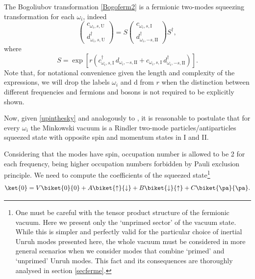 The Bogoliubov transformation \eqref{Bogoferm2} is a fermionic two-modes squeezing transformation for each $\omega_i$, indeed
\begin{equation}\label{upinthesky}\left(\!\begin{array}{c}
c_{\omega_i,s,\text{U}}\\
d^\dagger_{\omega_i,s,\text{U}}
\end{array}\!\right)=S\left(\!\begin{array}{c}
c_{\omega_i,s,\text{I}}\\
d^\dagger_{\omega_i,-s,\text{II}}
\end{array}\!\right)S^\dagger,\end{equation}
where
\begin{equation}\label{squeez}
S=\exp\left[r\left(c_{\omega_i,s,\text{I}}^\dagger\, d_{\omega_i,-s,\text{II}}+c_{\omega_i,s,\text{I}}\, d_{\omega_i,-s,\text{II}}^\dagger \right)\right].
\end{equation}
Note that, for notational convenience given the length and complexity of the expressions, we will drop the labels $\omega_i$ and d from $r$ when the distinction between different frequencies and fermions and bosons is not required to be explicitly shown.

Now, given \eqref{upinthesky} and analogously to \cite{Alicefalls,AlsingSchul}, it is reasonable to postulate that for every $\omega_i$ the Minkowski vacuum is a Rindler two-mode particles/antiparticles squeezed state with opposite spin and momentum states in I and II.

Considering that the modes have spin, occupation number is allowed to be 2 for each frequency, being higher occupation numbers forbidden by Pauli exclusion principle. We need to compute the coefficients of the squeezed state\footnote{One must be careful with the tensor product structure of the fermionic vacuum. Here we present only the `unprimed sector' of the vacuum state. While this is simpler and perfectly valid for the particular choice of inertial Unruh modes presented here, the whole vacuum must be considered in more general scenarios when we consider modes that combine `primed' and `unprimed' Unruh modes. This fact and its consequences are thoroughly analysed in section \ref{secferme}.}
\begin{equation}\label{vacuum0}
 \ket{0}=V\biket{0}{0}+A\biket{\uparrow}{\downarrow}+B\biket{\downarrow}{\uparrow}+ C\biket{\pa}{\pa}.
\end{equation}

